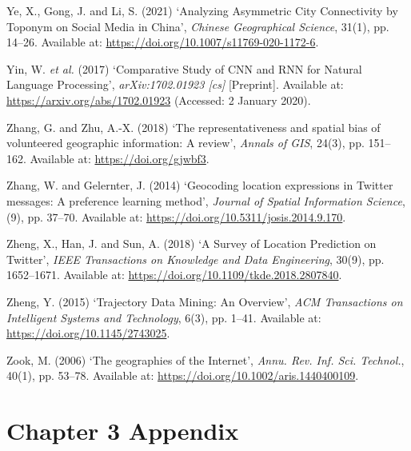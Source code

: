 \documentclass[
  letterpaper,
  11pt,
  english,
  onehalfspacing,
  headsepline]{MastersDoctoralThesis}
\newlength{\cslhangindent}
\newlength{\cslentryspacingunit} %
\newenvironment{CSLReferences}[2] %
 {%
  \setlength{\parindent}{0pt}
  \ifodd #1
  \let\oldpar\par
  \def\par{\hangindent=\cslhangindent\oldpar}
  \fi
  \setlength{\parskip}{#2\cslentryspacingunit}
 }%
 {}
\begin{document}
\begin{CSLReferences}{0}{0}
\leavevmode{}%
Ye, X., Gong, J. and Li, S. (2021) {`Analyzing {Asymmetric City
Connectivity} by {Toponym} on {Social Media} in {China}'}, \emph{Chinese
Geographical Science}, 31(1), pp. 14--26. Available at:
\url{https://doi.org/10.1007/s11769-020-1172-6}.

\leavevmode{}%
Yin, W. \emph{et al.} (2017) {`Comparative {Study} of {CNN} and {RNN}
for {Natural Language Processing}'}, \emph{arXiv:1702.01923 {[}cs{]}}
{[}Preprint{]}. Available at: \url{https://arxiv.org/abs/1702.01923}
(Accessed: 2 January 2020).

\leavevmode{}%
Zhang, G. and Zhu, A.-X. (2018) {`The representativeness and spatial
bias of volunteered geographic information: A review'}, \emph{Annals of
GIS}, 24(3), pp. 151--162. Available at: \url{https://doi.org/gjwbf3}.

\leavevmode{}%
Zhang, W. and Gelernter, J. (2014) {`Geocoding location expressions in
{Twitter} messages: {A} preference learning method'}, \emph{Journal of
Spatial Information Science}, (9), pp. 37--70. Available at:
\url{https://doi.org/10.5311/josis.2014.9.170}.

\leavevmode{}%
Zheng, X., Han, J. and Sun, A. (2018) {`A {Survey} of {Location
Prediction} on {Twitter}'}, \emph{IEEE Transactions on Knowledge and
Data Engineering}, 30(9), pp. 1652--1671. Available at:
\url{https://doi.org/10.1109/tkde.2018.2807840}.

\leavevmode{}%
Zheng, Y. (2015) {`Trajectory {Data Mining}: {An Overview}'}, \emph{ACM
Transactions on Intelligent Systems and Technology}, 6(3), pp. 1--41.
Available at: \url{https://doi.org/10.1145/2743025}.

\leavevmode{}%
Zook, M. (2006) {`The geographies of the {Internet}'}, \emph{Annu. Rev.
Inf. Sci. Technol.}, 40(1), pp. 53--78. Available at:
\url{https://doi.org/10.1002/aris.1440400109}.

\end{CSLReferences}

\cleardoublepage
{}
{}
\appendix

\hypertarget{chapter-3-appendix}{%
\chapter{Chapter 3 Appendix}\label{chapter-3-appendix}}
\end{document}
